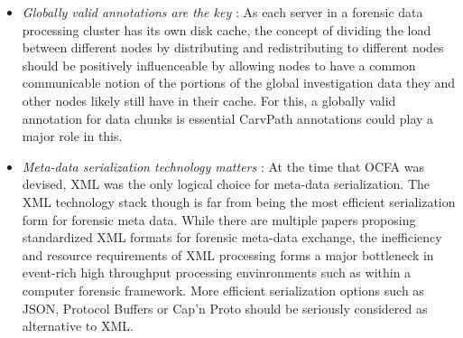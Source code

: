 \begin{itemize}
\item \emph{Globally valid annotations are the key} : As each server in a forensic data processing cluster has its own disk cache, the concept of dividing the load between different nodes by distributing and redistributing to different nodes should be positively influenceable by allowing nodes to have a common communicable notion of the portions of the global investigation data they and other nodes likely still have in their cache. For this, a globally valid annotation for data chunks is essential CarvPath annotations could play a major role in this.
\item \emph{Meta-data serialization technology matters} : At the time that OCFA was devised, XML was the only logical choice for meta-data serialization. The XML technology stack though is far from being the most efficient serialization form for forensic meta data. While there are multiple papers proposing standardized XML formats for forensic meta-data exchange, the inefficiency and resource requirements of XML processing forms a major bottleneck in event-rich high throughput processing envinronments such as within a computer forensic framework. More efficient serialization options such as JSON, Protocol Buffers or Cap'n Proto should be seriously considered as alternative to XML. 

\end{itemize}

